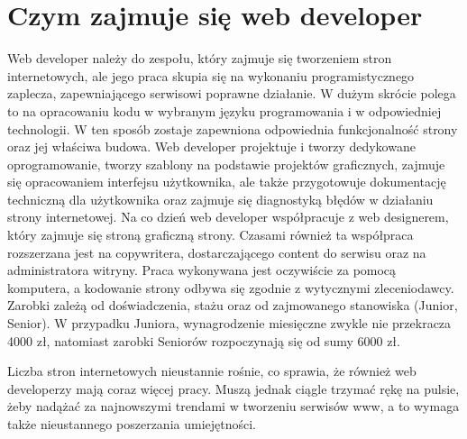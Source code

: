 \documentclass[12pt]{report}
\begin{document}
	\newpage
	\section{Czym zajmuje się web developer}
	Web developer należy do zespołu, który zajmuje się tworzeniem stron internetowych, ale jego praca skupia się na wykonaniu programistycznego zaplecza, zapewniającego serwisowi poprawne działanie. W dużym skrócie polega to na opracowaniu kodu w wybranym języku programowania i w odpowiedniej technologii. W ten sposób zostaje zapewniona odpowiednia funkcjonalność strony oraz jej właściwa budowa. Web developer projektuje i tworzy dedykowane oprogramowanie, tworzy szablony na podstawie projektów graficznych, zajmuje się opracowaniem interfejsu użytkownika, ale także przygotowuje dokumentację techniczną dla użytkownika oraz zajmuje się diagnostyką błędów w działaniu strony internetowej.
	Na co dzień web developer współpracuje z web designerem, który zajmuje się stroną graficzną strony. Czasami również ta współpraca rozszerzana jest na copywritera, dostarczającego content do serwisu oraz na administratora witryny. Praca wykonywana jest oczywiście za pomocą komputera, a kodowanie strony odbywa się zgodnie z wytycznymi zleceniodawcy. Zarobki zależą od doświadczenia, stażu oraz od zajmowanego stanowiska (Junior, Senior). W przypadku Juniora, wynagrodzenie miesięczne zwykle nie przekracza 4000 zł, natomiast zarobki Seniorów rozpoczynają się od sumy 6000 zł.
	\par
	Liczba stron internetowych nieustannie rośnie, co sprawia, że również web developerzy mają coraz więcej pracy. Muszą jednak ciągle trzymać rękę na pulsie, żeby nadążać za najnowszymi trendami w tworzeniu serwisów www, a to wymaga także nieustannego poszerzania umiejętności.
	\cite{webd}
	

	\listoffigures
	
\end{document}
